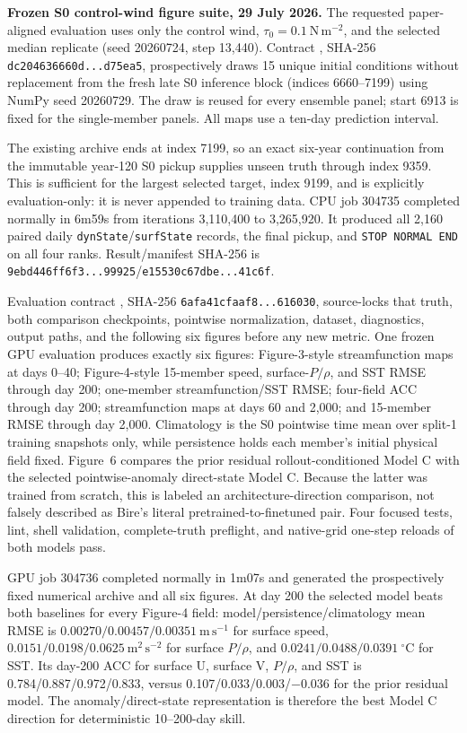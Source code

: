 \documentclass[11pt]{article}
\begin{document}
\textbf{Frozen S0 control-wind figure suite, 29 July 2026.}  The requested
paper-aligned evaluation uses only the control wind,
\(\tau_0=0.1~\mathrm{N\,m^{-2}}\), and the selected median replicate
(seed 20260724, step 13,440).  Contract
, SHA-256
\texttt{dc204636660d...d75ea5}, prospectively draws 15 unique initial
conditions without replacement from the fresh late S0 inference block
(indices 6660--7199) using NumPy seed 20260729.  The draw is reused for every
ensemble panel; start 6913 is fixed for the single-member panels.  All maps
use a ten-day prediction interval.

The existing archive ends at index 7199, so an exact six-year continuation
from the immutable year-120 S0 pickup supplies unseen truth through index
9359.  This is sufficient for the largest selected target, index 9199, and
is explicitly evaluation-only: it is never appended to training data.
CPU job 304735 completed normally in 6m59s from iterations 3,110,400 to
3,265,920.  It produced all 2,160 paired daily
\texttt{dynState}/\texttt{surfState} records, the final pickup, and
\texttt{STOP NORMAL END} on all four ranks.  Result/manifest SHA-256 is
\texttt{9ebd446ff6f3...99925}/\texttt{e15530c67dbe...41c6f}.

Evaluation contract , SHA-256
\texttt{6afa41cfaaf8...616030}, source-locks that truth, both comparison
checkpoints, pointwise normalization, dataset, diagnostics, output paths,
and the following six figures before any new metric.  One frozen GPU
evaluation produces exactly six
figures: Figure-3-style streamfunction maps at days 0--40; Figure-4-style
15-member speed, surface-\(P/\rho\), and SST RMSE through day 200; one-member
streamfunction/SST RMSE; four-field ACC through day 200; streamfunction maps
at days 60 and 2,000; and 15-member RMSE through day 2,000.  Climatology is
the S0 pointwise time mean over split-1 training snapshots only, while
persistence holds each member's initial physical field fixed.  Figure~6
compares the prior residual rollout-conditioned Model C with the selected
pointwise-anomaly direct-state Model C.  Because the latter was trained from
scratch, this is labeled an architecture-direction comparison, not falsely
described as Bire's literal pretrained-to-finetuned pair.  Four focused
tests, lint, shell validation, complete-truth preflight, and native-grid
one-step reloads of both models pass.

GPU job 304736 completed normally in 1m07s and generated the prospectively
fixed numerical archive and all six figures.  At day 200 the selected model
beats both baselines for every Figure-4 field: model/persistence/climatology
mean RMSE is \(0.00270/0.00457/0.00351~\mathrm{m\,s^{-1}}\) for surface
speed, \(0.0151/0.0198/0.0625~\mathrm{m^2\,s^{-2}}\) for surface
\(P/\rho\), and \(0.0241/0.0488/0.0391~{}^\circ\mathrm{C}\) for SST.
Its day-200 ACC for surface U, surface V, \(P/\rho\), and SST is
0.784/0.887/0.972/0.833, versus 0.107/0.033/0.003/\(-0.036\) for the
prior residual model.  The anomaly/direct-state representation is therefore
the best Model C direction for deterministic 10--200-day skill.
\end{document}
